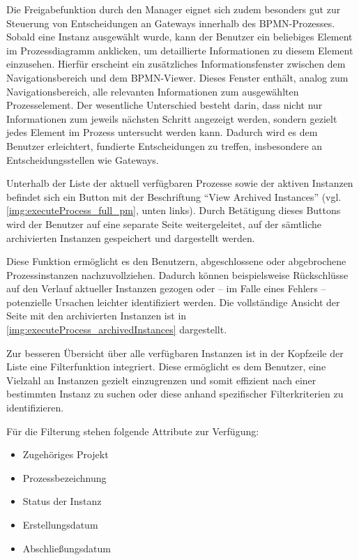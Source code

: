 Die Freigabefunktion durch den Manager eignet sich zudem besonders gut zur Steuerung von Entscheidungen an Gateways innerhalb des BPMN-Prozesses. Sobald eine Instanz ausgewählt wurde, kann der Benutzer ein beliebiges Element im Prozessdiagramm anklicken, um detaillierte Informationen zu diesem Element einzusehen. Hierfür erscheint ein zusätzliches Informationsfenster zwischen dem Navigationsbereich und dem BPMN-Viewer. Dieses Fenster enthält, analog zum Navigationsbereich, alle relevanten Informationen zum ausgewählten Prozesselement. Der wesentliche Unterschied besteht darin, dass nicht nur Informationen zum jeweils nächsten Schritt angezeigt werden, sondern gezielt jedes Element im Prozess untersucht werden kann. Dadurch wird es dem Benutzer erleichtert, fundierte Entscheidungen zu treffen, insbesondere an Entscheidungsstellen wie Gateways.



Unterhalb der Liste der aktuell verfügbaren Prozesse sowie der aktiven Instanzen befindet sich ein Button mit der Beschriftung \enquote{View Archived Instances} (vgl. \autoref{img:executeProcess_full_pm}, unten links). Durch Betätigung dieses Buttons wird der Benutzer auf eine separate Seite weitergeleitet, auf der sämtliche archivierten Instanzen gespeichert und dargestellt werden. 

Diese Funktion ermöglicht es den Benutzern, abgeschlossene oder abgebrochene Prozessinstanzen nachzuvollziehen. Dadurch können beispielsweise Rückschlüsse auf den Verlauf aktueller Instanzen gezogen oder – im Falle eines Fehlers – potenzielle Ursachen leichter identifiziert werden. Die vollständige Ansicht der Seite mit den archivierten Instanzen ist in \autoref{img:executeProcess_archivedInstances} dargestellt.



Zur besseren Übersicht über alle verfügbaren Instanzen ist in der Kopfzeile der Liste eine Filterfunktion integriert. Diese ermöglicht es dem Benutzer, eine Vielzahl an Instanzen gezielt einzugrenzen und somit effizient nach einer bestimmten Instanz zu suchen oder diese anhand spezifischer Filterkriterien zu identifizieren.

Für die Filterung stehen folgende Attribute zur Verfügung:
\begin{itemize}
  \item Zugehöriges Projekt
  \item Prozessbezeichnung
  \item Status der Instanz
  \item Erstellungsdatum
  \item Abschließungsdatum
\end{itemize}

